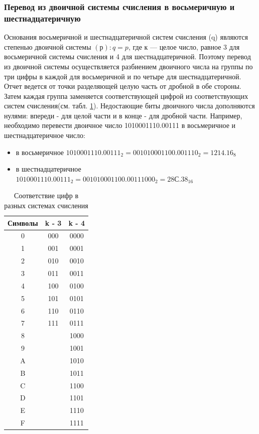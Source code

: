 \subsubsection{Перевод из двоичной системы счисления в восьмеричную и шестнадцатеричную}

Основания восьмеричной и шестнадцатеричной систем счисления (q) являются степенью двоичной системы $(р):q=p$, где к --- целое число, равное 3 для восьмеричной системы счисления и 4 для шестнадцатеричной. Поэтому перевод из двоичной системы осуществляется разбиением двоичного числа на группы по три цифры в каждой для восьмеричной и по четыре для шестнадцатеричной. Отчет ведется от точки разделяющей целую часть от дробной в обе стороны. Затем каждая группа заменяется соответствующей цифрой из соответствующих систем счисления(см. табл. \ref{tab:octhex}). Недостающие биты двоичного числа дополняются нулями: впереди - для целой части и в конце - для дробной части. Например, необходимо перевести двоичное число 1010001110.00111 в восьмеричное и шестнадцатеричное число:
\begin{itemize}
  \item в восьмеричное $1010001110.00111_{2} = 001 010 001 100.001 110_{2} = 1214.16_{8}$
  \item в шестнадцатеричное $1010001110.00111_{2} = 0010 1000 1100.0011 1000_{2} = 28С.38_{16}$
\end{itemize}

\begin{table}[h]
  \caption{Соответствие цифр в разных системах счисления}
  \begin{center}\label{tab:octhex}
    \begin{tabular}{|c|c|c|}
      \hline
     Символы & k - 3 & k - 4 \\
     \hline
      0 & 000 & 0000 \\
      1 & 001 & 0001 \\
      2 & 010 & 0010 \\
      3 & 011 & 0011 \\
      4 & 100 & 0100 \\
      5 & 101 & 0101 \\
      6 & 110 & 0110 \\
      7 & 111 & 0111 \\
      8 &     & 1000 \\
      9 &     & 1001 \\
      A &     & 1010 \\
      B &     & 1011 \\
      C &     & 1100 \\
      D &     & 1101 \\
      E &     & 1110 \\
      F &     & 1111 \\
      \hline
     \end{tabular}
  \end{center}
\end{table}

